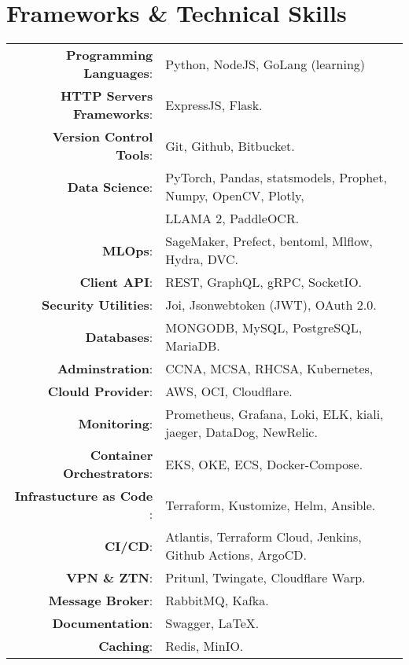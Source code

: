 \documentclass[a4paper,10pt]{article}
\begin{document}
\section{\textbf{Frameworks \& Technical Skills}}

\begin{longtable}{r p{16cm}}	
    \textbf{Programming Languages}:& Python, NodeJS, GoLang (learning)\\
    \textbf{HTTP Servers Frameworks}:& ExpressJS, Flask.\\
    \textbf{Version Control Tools}:& Git, Github, Bitbucket.\\
    \textbf{Data Science}:& PyTorch, Pandas, statsmodels, Prophet, Numpy, OpenCV, Plotly,\\
    & LLAMA 2, PaddleOCR.\\
    \textbf{MLOps}:& SageMaker, Prefect, bentoml, Mlflow, Hydra, DVC.\\
    \textbf{Client API}:& REST, GraphQL, gRPC, SocketIO.\\
    \textbf{Security Utilities}:& Joi, Jsonwebtoken (JWT), OAuth 2.0.\\ 
    \textbf{Databases}:& MONGODB, MySQL, PostgreSQL, MariaDB.\\
    \textbf{Adminstration}:& CCNA, MCSA, RHCSA, Kubernetes,\\
    \textbf{Clould Provider}:& AWS, OCI, Cloudflare. \\
    \textbf{Monitoring}:& Prometheus, Grafana, Loki, ELK, kiali, jaeger, DataDog, NewRelic.\\ 
    \textbf{Container Orchestrators}:& EKS, OKE, ECS, Docker-Compose. \\
    \textbf{Infrastucture as Code }:& Terraform, Kustomize, Helm, Ansible.\\
    \textbf{CI/CD}:& Atlantis, Terraform Cloud, Jenkins, Github Actions, ArgoCD.\\
    \textbf{VPN \& ZTN}:& Pritunl, Twingate, Cloudflare Warp. \\
    \textbf{Message Broker}:& RabbitMQ, Kafka.\\
    \textbf{Documentation}:& Swagger, \LaTeX.\\
    \textbf{Caching}:& Redis, MinIO.\\
\end{longtable}
\end{document}
